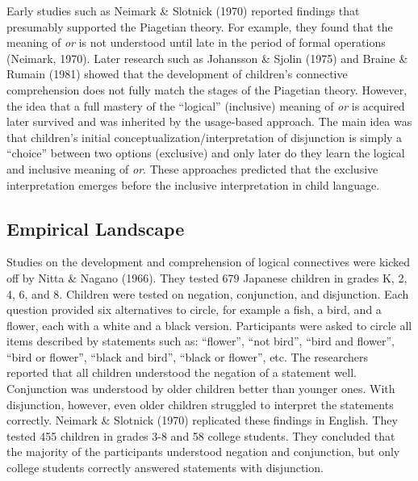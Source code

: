 \documentclass[oneside]{report}
\theoremstyle{definition}
\theoremstyle{definition}
\theoremstyle{definition}
\theoremstyle{remark}
\begin{document}
Early studies such as Neimark \& Slotnick (1970) reported findings that
presumably supported the Piagetian theory. For example, they found that
the meaning of \emph{or} is not understood until late in the period of
formal operations (Neimark, 1970). Later research such as Johansson \&
Sjolin (1975) and Braine \& Rumain (1981) showed that the development of
children's connective comprehension does not fully match the stages of
the Piagetian theory. However, the idea that a full mastery of the
``logical'' (inclusive) meaning of \emph{or} is acquired later survived
and was inherited by the usage-based approach. The main idea was that
children's initial conceptualization/interpretation of disjunction is
simply a ``choice'' between two options (exclusive) and only later do
they learn the logical and inclusive meaning of \emph{or}. These
approaches predicted that the exclusive interpretation emerges before
the inclusive interpretation in child language.

\subsection{Empirical Landscape}\label{empirical-landscape}

Studies on the development and comprehension of logical connectives were
kicked off by Nitta \& Nagano (1966). They tested 679 Japanese children
in grades K, 2, 4, 6, and 8. Children were tested on negation,
conjunction, and disjunction. Each question provided six alternatives to
circle, for example a fish, a bird, and a flower, each with a white and
a black version. Participants were asked to circle all items described
by statements such as: ``flower'', ``not bird'', ``bird and flower'',
``bird or flower'', ``black and bird'', ``black or flower'', etc. The
researchers reported that all children understood the negation of a
statement well. Conjunction was understood by older children better than
younger ones. With disjunction, however, even older children struggled
to interpret the statements correctly. Neimark \& Slotnick (1970)
replicated these findings in English. They tested 455 children in grades
3-8 and 58 college students. They concluded that the majority of the
participants understood negation and conjunction, but only college
students correctly answered statements with disjunction.
\end{document}
